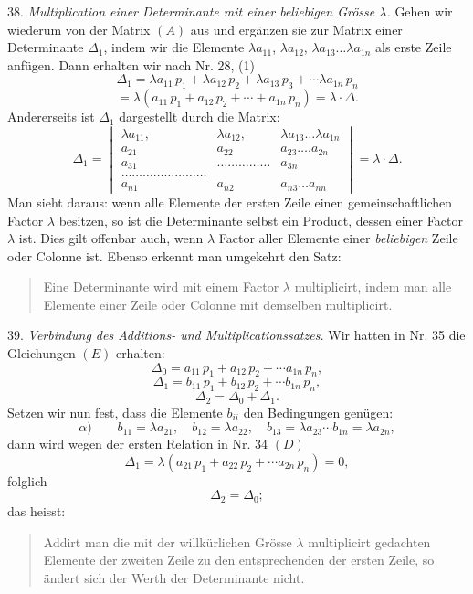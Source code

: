 38. \textit{Multiplication einer Determinante mit einer beliebigen Grösse $\lambda$.} Gehen wir wiederum von der Matrix $(A)$ aus und ergänzen sie zur Matrix einer Determinante $\varDelta_1$, indem wir die Elemente $\lambda a_{11}$, $\lambda a_{12}$, $\lambda a_{13} \ldots \lambda a_{1n}$ als erste Zeile anfügen. Dann erhalten wir nach Nr. 28, (1)
\[
\varDelta_1 = \lambda a_{11}\,p_1 + \lambda a_{12}\,p_2 + \lambda a_{13}\,p_3 + \cdots \lambda a_{1n}\,p_n
\]
\[
= \lambda(a_{11}\,p_1 + a_{12}\,p_2 + \cdots + a_{1n}\,p_n) = \lambda \cdot \varDelta.
\]
Andererseits ist $\varDelta_1$ dargestellt durch die Matrix:
\[
\varDelta_1 = \begin{vmatrix}
\lambda a_{11}, & \lambda a_{12}, & \lambda a_{13} \ldots \lambda a_{1n}\\
a_{21} & a_{22} & a_{23} \ldots . a_{2n}\\
a_{31} & \ldots\ldots\ldots\ldots\ldots & a_{3n}\\
\ldots\ldots\ldots\ldots\ldots\ldots\ldots\ldots\\
a_{n1} & a_{n2} & a_{n3} \ldots a_{nn}
\end{vmatrix} = \lambda \cdot \varDelta.
\]
Man sieht daraus: wenn alle Elemente der ersten Zeile einen gemeinschaftlichen Factor $\lambda$ besitzen, so ist die Determinante selbst ein Product, dessen einer Factor $\lambda$ ist. Dies gilt offenbar auch, wenn $\lambda$ Factor aller Elemente einer \textit{beliebigen} Zeile oder Colonne ist. Ebenso erkennt man umgekehrt den Satz:
\begin{quote}
\glqq Eine Determinante wird mit einem Factor $\lambda$ multiplicirt, indem man alle Elemente einer Zeile oder Colonne mit demselben multiplicirt.\grqq{}
\end{quote}
39. \textit{Verbindung des Additions- und Multiplicationssatzes.} Wir hatten in Nr. 35 die Gleichungen $(E)$ erhalten:
\[
\varDelta_0 = a_{11}\,p_1 + a_{12}\,p_2 + \cdots a_{1n}\,p_n,
\]
\[
\varDelta_1 = b_{11}\,p_1 + b_{12}\,p_2 + \cdots b_{1n}\,p_n,
\]
\[
\varDelta_2 = \varDelta_0 + \varDelta_1.
\]
Setzen wir nun fest, dass die Elemente $b_{ii}$ den Bedingungen genügen:
\[
\alpha)\qquad b_{11} = \lambda a_{21}, \quad b_{12} = \lambda a_{22}, \quad b_{13} = \lambda a_{23} \cdots b_{1n} = \lambda a_{2n},
\]
dann wird wegen der ersten Relation in Nr. 34 $(D)$
\[
\varDelta_1 = \lambda(a_{21}\,p_1 + a_{22}\,p_2 + \cdots a_{2n}\,p_n) = 0,
\]
folglich
\[
\varDelta_2 = \varDelta_0;
\]
das heisst:
\begin{quote}
\glqq Addirt man die mit der willkürlichen Grösse $\lambda$ multiplicirt gedachten Elemente der zweiten Zeile zu den entsprechenden der ersten Zeile, so ändert sich der Werth der Determinante nicht.\grqq{}
\end{quote}


